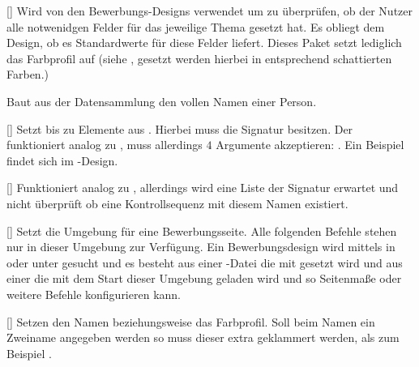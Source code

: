 %
%
%

[]
Wird von den Bewerbungs-Designs verwendet um zu überprüfen, ob der Nutzer alle notwenidgen Felder für das jeweilige Thema gesetzt hat. Es obliegt dem Design, ob es Standardwerte für diese Felder liefert. Dieses Paket setzt lediglich das Farbprofil auf  (siehe , gesetzt werden hierbei  in entsprechend schattierten Farben.)

%
%
%

Baut aus der Datensammlung den vollen Namen einer Person.

%
%
%

[]
Setzt bis zu  Elemente aus . Hierbei muss  die Signatur  besitzen. Der  funktioniert analog zu , muss allerdings $4$ Argumente akzeptieren: . Ein Beispiel findet sich im -Design.

%
%
%

[]
Funktioniert analog zu , allerdings wird eine Liste der Signatur  erwartet und nicht überprüft ob eine Kontrollsequenz mit diesem Namen existiert.

%
%
%

[]
Setzt die Umgebung für eine Bewerbungsseite. Alle folgenden Befehle stehen nur in dieser Umgebung zur Verfügung. Ein Bewerbungsdesign wird mittels  in  oder unter  gesucht und es besteht aus einer -Datei die mit  gesetzt wird und aus einer  die mit dem Start dieser Umgebung geladen wird und so Seitenmaße oder weitere Befehle konfigurieren kann.

%
%
%

[\cmdlist{}]
Setzen den Namen beziehungsweise das Farbprofil. Soll beim Namen ein Zweiname angegeben werden so muss dieser extra geklammert werden, als zum Beispiel .

